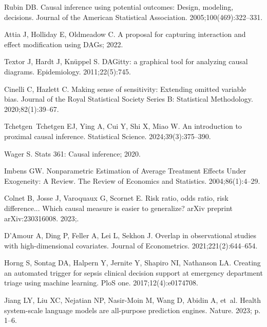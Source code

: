\documentclass[10pt,letterpaper]{article}
\begin{document}
\begin{thebibliography}{100}
  Rubin DB.
  \newblock Causal inference using potential outcomes: Design, modeling, decisions.
  \newblock Journal of the American Statistical Association. 2005;100(469):322--331.

  Attia J, Holliday E, Oldmeadow C. A proposal for capturing interaction and effect modification using DAGs; 2022.

  Textor J, Hardt J, Kn{\"u}ppel S.
  \newblock DAGitty: a graphical tool for analyzing causal diagrams.
  \newblock Epidemiology. 2011;22(5):745.

  Cinelli C, Hazlett C.
  \newblock Making sense of sensitivity: Extending omitted variable bias.
  \newblock Journal of the Royal Statistical Society Series B: Statistical Methodology. 2020;82(1):39--67.

  Tchetgen~Tchetgen EJ, Ying A, Cui Y, Shi X, Miao W.
  \newblock An introduction to proximal causal inference.
  \newblock Statistical Science. 2024;39(3):375--390.

  Wager S. Stats 361: Causal inference; 2020.

  Imbens GW.
  \newblock Nonparametric {Estimation} of {Average} {Treatment} {Effects} {Under} {Exogeneity}: {A} {Review}.
  \newblock The Review of Economics and Statistics. 2004;86(1):4--29.

  Colnet B, Josse J, Varoquaux G, Scornet E.
  \newblock Risk ratio, odds ratio, risk difference... Which causal measure is easier to generalize?
  \newblock arXiv preprint arXiv:230316008. 2023;.

  D'Amour A, Ding P, Feller A, Lei L, Sekhon J.
  \newblock Overlap in observational studies with high-dimensional covariates.
  \newblock Journal of Econometrics. 2021;221(2):644--654.

  Horng S, Sontag DA, Halpern Y, Jernite Y, Shapiro NI, Nathanson LA.
  \newblock Creating an automated trigger for sepsis clinical decision support at emergency department triage using machine learning.
  \newblock PloS one. 2017;12(4):e0174708.

  Jiang LY, Liu XC, Nejatian NP, Nasir-Moin M, Wang D, Abidin A, et~al.
  \newblock Health system-scale language models are all-purpose prediction engines.
  \newblock Nature. 2023; p. 1--6.


\end{thebibliography}
\end{document}
